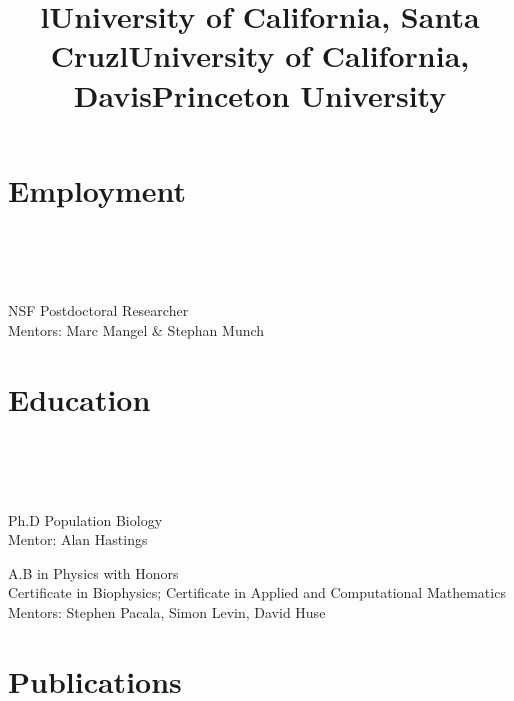 \documentclass[margin]{res}
\begin{document}
\begin{resume}

\section{Employment}
\begin{format}
\title{l}\\\\
\body\\
\end{format}

\title{\textbf{University of California, Santa Cruz}}
\begin{position}
NSF Postdoctoral Researcher \\
Mentors: Marc Mangel \& Stephan Munch 
\end{position}

\section{Education}
\begin{format}
\title{l}\\\\
\body\\
\end{format}

\title{\textbf{University of California, Davis}}
\begin{position}
Ph.D Population Biology \\
Mentor: Alan Hastings
\end{position}

\title{\textbf{Princeton University}}
\begin{position}
A.B  in Physics with Honors \\ 
Certificate in Biophysics; Certificate in Applied and Computational Mathematics\\
Mentors: Stephen Pacala, Simon Levin, David Huse
\end{position}

\section{Publications}


\end{resume}
\end{document}
